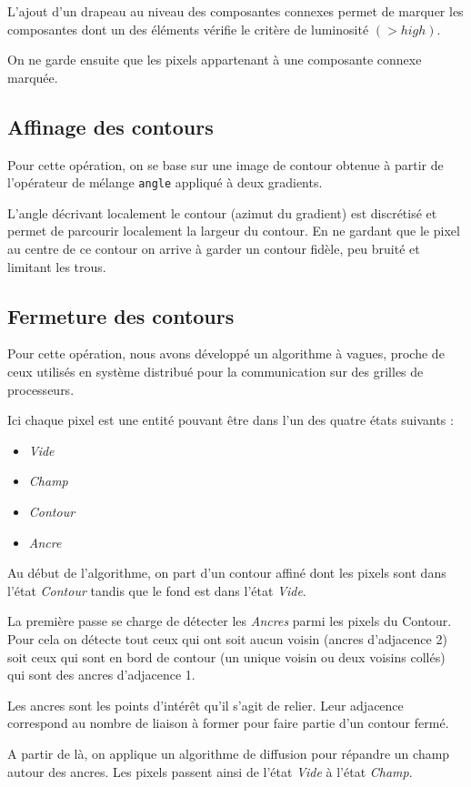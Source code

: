 L'ajout d'un drapeau au niveau des composantes connexes permet de marquer les composantes dont un des éléments vérifie le critère de luminosité $(>high)$.

On ne garde ensuite que les pixels appartenant à une composante connexe marquée.

\subsection{Affinage des contours}
Pour cette opération, on se base sur une image de contour obtenue à partir de l'opérateur de mélange \texttt{angle} appliqué à deux gradients.

L'angle décrivant localement le contour (azimut du gradient) est discrétisé et permet de parcourir localement la largeur du contour. En ne gardant que le pixel au centre de ce contour on arrive à garder un contour fidèle, peu bruité et limitant les trous.

\subsection{Fermeture des contours}
Pour cette opération, nous avons développé un algorithme à vagues, proche de ceux utilisés en système distribué pour la communication sur des grilles de processeurs.

Ici chaque pixel est une entité pouvant être dans l'un des quatre états suivants :
\begin{itemize}
	\item \emph{Vide}
	\item \emph{Champ}
	\item \emph{Contour}
	\item \emph{Ancre}
\end{itemize}

Au début de l'algorithme, on part d'un contour affiné dont les pixels sont dans l'état \emph{Contour} tandis que le fond est dans l'état \emph{Vide}.

La première passe se charge de détecter les \emph{Ancres} parmi les pixels du Contour. Pour cela on détecte tout ceux qui ont soit aucun voisin (ancres d'adjacence 2) soit ceux qui sont en bord de contour (un unique voisin ou deux voisins collés) qui sont des ancres d'adjacence 1.

Les ancres sont les points d'intérêt qu'il s'agit de relier. Leur adjacence correspond au nombre de liaison à former pour faire partie d'un contour fermé.

A partir de là, on applique un algorithme de diffusion pour répandre un champ autour des ancres. Les pixels passent ainsi de l'état \emph{Vide} à l'état \emph{Champ}.

